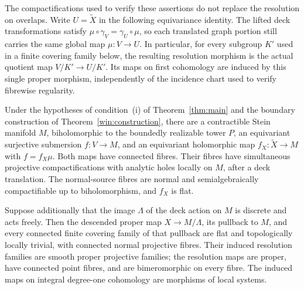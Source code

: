 The compactifications used to verify these assertions do not
replace the resolution on overlaps.
Write \(U=\widetilde X\) in the following equivariance identity.
The lifted deck transformations satisfy
\(\mu\circ\gamma_V=\gamma_U\circ\mu\), so each translated graph
portion still carries the same global map \(\mu:V\to U\).
In particular, for every subgroup \(K'\) used in a finite covering
family below, the resulting resolution morphism is the actual
quotient map \(V/K'\to U/K'\). Its maps on first cohomology are
induced by this single proper morphism, independently of the
incidence chart used to verify fibrewise regularity.

\begin{theorem}\label{quo:projection}
Under the hypotheses of condition~\textup{(i)} of
Theorem~\ref{thm:main} and the boundary construction of
Theorem~\ref{win:construction}, there are a contractible Stein
manifold \(M\), biholomorphic to the boundedly realizable tower
\(P\), an equivariant surjective submersion \(f:V\to M\), and
an equivariant holomorphic map \(f_X:\widetilde X\to M\) with
\(f=f_X\mu\). Both maps have connected fibres. Their fibres
have simultaneous projective compactifications with analytic
holes locally on \(M\), after a deck translation. The
normal-source fibres are normal and semialgebraically
compactifiable up to biholomorphism, and \(f_X\) is flat.

Suppose additionally that the image \(\Lambda\) of the deck
action on \(M\) is discrete and acts freely. Then the descended
proper map \(X\to M/\Lambda\), its pullback to \(M\), and
every connected finite covering family of that pullback are
flat and topologically locally trivial, with connected normal
projective fibres. Their induced resolution families are smooth
proper projective families; the resolution maps are proper,
have connected point fibres, and are bimeromorphic on every
fibre. The induced maps on integral degree-one cohomology are
morphisms of local systems.
\end{theorem}
